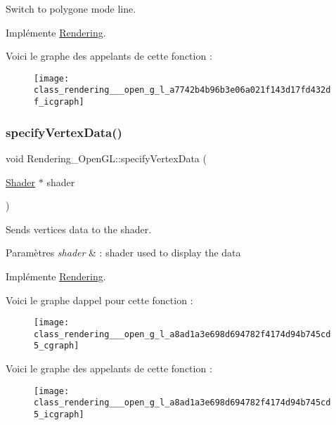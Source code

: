 Switch to polygone mode line. 



Implémente \hyperlink{class_rendering_aeb3922ecc539c6d8e9339fb3760cd560}{Rendering}.

Voici le graphe des appelants de cette fonction \+:\nopagebreak
\begin{figure}[H]
\begin{center}
\leavevmode
\texttt{[image: class\_rendering\_\_\_open\_g\_l\_a7742b4b96b3e06a021f143d17fd432df\_icgraph]}
\end{center}
\end{figure}
\mbox{\label{class_rendering___open_g_l_a8ad1a3e698d694782f4174d94b745cd5}} 
\subsubsection{\texorpdfstring{specify\+Vertex\+Data()}{specifyVertexData()}}
{\footnotesize\ttfamily void Rendering\+\_\+\+Open\+G\+L\+::specify\+Vertex\+Data (\begin{DoxyParamCaption}\item[{\hyperlink{class_shader}{Shader} $\ast$}]{shader }\end{DoxyParamCaption})\hspace{0.3cm}{\ttfamily [virtual]}}



Sends vertices data to the shader. 


\begin{DoxyParams}{Paramètres}
{\em shader} & \+: shader used to display the data \\
\hline
\end{DoxyParams}


Implémente \hyperlink{class_rendering_aecb85f0a1da2d14cde84a918e2636841}{Rendering}.

Voici le graphe d\textquotesingle{}appel pour cette fonction \+:\nopagebreak
\begin{figure}[H]
\begin{center}
\leavevmode
\texttt{[image: class\_rendering\_\_\_open\_g\_l\_a8ad1a3e698d694782f4174d94b745cd5\_cgraph]}
\end{center}
\end{figure}
Voici le graphe des appelants de cette fonction \+:\nopagebreak
\begin{figure}[H]
\begin{center}
\leavevmode
\texttt{[image: class\_rendering\_\_\_open\_g\_l\_a8ad1a3e698d694782f4174d94b745cd5\_icgraph]}
\end{center}
\end{figure}
\mbox{\label{class_rendering___open_g_l_a3d370bebbf4e66ba7bd4ea61dc59bef1}} 
